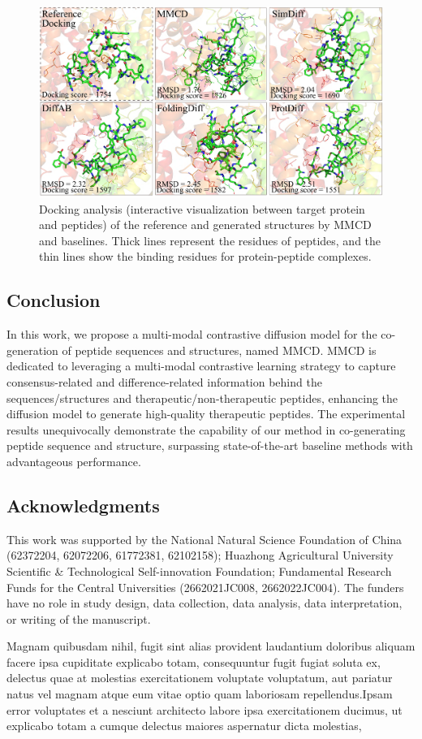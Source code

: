 \documentclass[letterpaper]{article} %
\begin{document}
\begin{figure}[ht]
\includegraphics[scale=0.135]{fig4.pdf}
\caption{Docking analysis (interactive visualization between target protein and peptides) of the reference and generated structures by MMCD and baselines. Thick lines represent the residues of peptides, and the thin lines show the binding residues for protein-peptide complexes.}
\end{figure}

\subsection{Conclusion}
In this work, we propose a multi-modal contrastive diffusion model for the co-generation of peptide sequences and structures, named MMCD. MMCD is dedicated to leveraging a multi-modal contrastive learning strategy to capture consensus-related and difference-related information behind the sequences/structures and therapeutic/non-therapeutic peptides, enhancing the diffusion model to generate high-quality therapeutic peptides. The experimental results unequivocally demonstrate the capability of our method in co-generating peptide sequence and structure, surpassing state-of-the-art baseline methods with advantageous performance.

\subsection{Acknowledgments}
This work was supported by the National Natural Science Foundation of China (62372204, 62072206, 61772381, 62102158); Huazhong Agricultural University Scientific \& Technological Self-innovation Foundation; Fundamental Research Funds for the Central Universities (2662021JC008, 2662022JC004). The funders have no role in study design, data collection, data analysis, data interpretation, or writing of the manuscript.

Magnam quibusdam nihil, fugit sint alias provident laudantium doloribus aliquam facere ipsa cupiditate explicabo totam, consequuntur fugit fugiat soluta ex, delectus quae at molestias exercitationem voluptate voluptatum, aut pariatur natus vel magnam atque eum vitae optio quam laboriosam repellendus.Ipsam error voluptates et a nesciunt architecto labore ipsa exercitationem ducimus, ut explicabo totam a cumque delectus maiores aspernatur dicta molestias,

\end{document}
